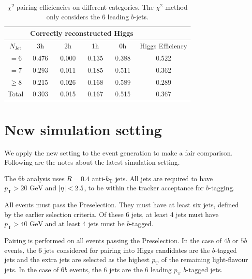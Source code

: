\documentclass[12pt]{article}
\begin{document}
	\begin{table}[htpb]
		\centering
		\caption{$\chi^2$ pairing efficiencies on different categories. The $\chi^2$ method only considers the 6 leading $b$-jets.}
		\label{tab:chi2_abs_pairing_triHiggs_6b_3h}
		\begin{tabular}{c|cccc|c}
			\multicolumn{1}{l|}{} & \multicolumn{4}{c|}{Correctly reconstructed Higgs} & \multicolumn{1}{l}{} \\ \hline
			$N_\text{Jet}$        & 3h          & 2h         & 1h         & 0h         & Higgs Efficiency     \\ \hline
			$=6$                  & 0.476       & 0.000      & 0.135      & 0.388      & 0.522                \\
			$=7$                  & 0.293       & 0.011      & 0.185      & 0.511      & 0.362                \\
			$\ge 8$               & 0.215       & 0.026      & 0.168      & 0.589      & 0.289                \\ \hline
			Total                 & 0.303       & 0.015      & 0.167      & 0.515      & 0.367               
		\end{tabular}
	\end{table}
\section{New simulation setting}%
\label{sec:new_simulation_setting}
    We apply the new setting to the event generation to make a fair comparison. Following are the notes about the latest simulation setting.

    The $6b$ analysis uses $R = 0.4$ anti-$k_{\text{T}}$ jets. All jets are required to have $p_{\text{T}} > 20 \text{ GeV}$ and  $\abs{\eta} < 2.5$, to be within the tracker acceptance for $b$-tagging. 

    All events must pass the Preselection. They must have at least six jets, defined by the earlier selection criteria. Of these 6 jets, at least 4 jets must have $p_{\text{T}} > \text{40 GeV}$ and at least 4 jets must be $b$-tagged.

    Pairing is performed on all events passing the Preselection. In the case of $4b$ or $5b$ events, the 6 jets considered for pairing into Higgs candidates are the $b$-tagged jets and the extra jets are selected as the highest $p_{\text{T}}$ of the remaining light-flavour jets. In the case of $6b$ events, the 6 jets are the 6 leading $p_{\text{T}}$ $b$-tagged jets.
\end{document}
